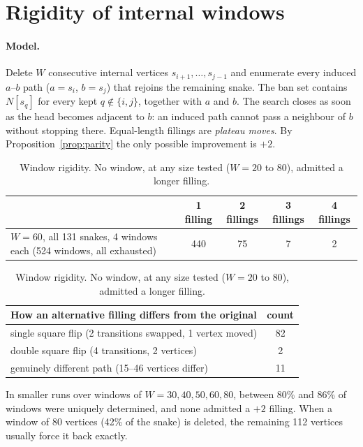 \documentclass[11pt,a4paper]{article}
\theoremstyle{definition}
\newcommand{\N}{N}
\begin{document}
\section{Rigidity of internal windows}\label{sec:rigid}

\paragraph{Model.} Delete $W$ consecutive internal vertices $s_{i+1},\dots,s_{j-1}$ and enumerate every induced $a$--$b$ path ($a=s_i$, $b=s_j$) that rejoins the remaining snake. The ban set contains $\N[s_q]$ for every kept $q\notin\{i,j\}$, together with $a$ and $b$. The search closes as soon as the head becomes adjacent to $b$: an induced path cannot pass a neighbour of $b$ without stopping there. Equal-length fillings are \emph{plateau moves}. By Proposition~\ref{prop:parity} the only possible improvement is $+2$.

\begin{table}[ht]
\centering\small
\begin{tabular}{p{}cccc}
\toprule
& 1 filling & 2 fillings & 3 fillings & 4 fillings\\
\midrule
$W=60$, all 131 snakes, 4 windows each (524 windows, all exhausted) & 440 & 75 & 7 & 2\\
\bottomrule
\end{tabular}

\medskip
\begin{tabular}{lc}
\toprule
How an alternative filling differs from the original & count\\
\midrule
single square flip (2 transitions swapped, 1 vertex moved) & 82\\
double square flip (4 transitions, 2 vertices) & 2\\
genuinely different path (15--46 vertices differ) & 11\\
\bottomrule
\end{tabular}
\caption{Window rigidity. No window, at any size tested ($W=20$ to $80$), admitted a longer filling.}
\label{tab:rigid}
\end{table}

In smaller runs over windows of $W=30,40,50,60,80$, between 80\% and 86\% of windows were uniquely determined, and none admitted a $+2$ filling. When a window of 80 vertices (42\% of the snake) is deleted, the remaining 112 vertices usually force it back exactly.
\end{document}
